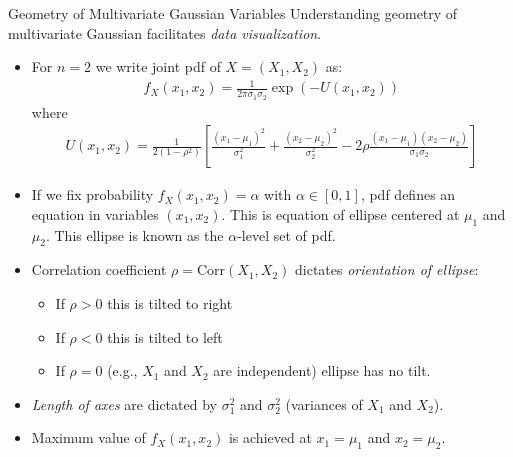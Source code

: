 \documentclass[9pt]{beamer}
\begin{document}
%
\begin{frame}{Geometry of Multivariate Gaussian Variables}
Understanding geometry of multivariate Gaussian facilitates {\em data visualization}.  

\begin{itemize}
\setlength{\itemsep}{5pt}
\item For $n=2$ we write joint pdf of $X=(X_1,X_2)$ as:
\begin{align*}
f_X(x_1,x_2)=\frac{1}{2\pi\sigma_1\sigma_2}\exp\left(-U(x_1,x_2)\right)
\end{align*}
where 
\begin{align*}
U(x_1,x_2)=\frac{1}{2(1-\rho^2)}\left[\frac{(x_1-\mu_1)^2}{\sigma_1^2}+\frac{(x_2-\mu_2)^2}{\sigma_2^2}-2\rho\frac{(x_1-\mu_1)(x_2-\mu_2)}{\sigma_1\sigma_2}\right]
\end{align*}

\item If we fix probability $f_X(x_1,x_2)=\alpha$ with $\alpha\in [0,1]$, pdf defines an equation in variables $(x_1,x_2)$.  This is equation of ellipse centered at $\mu_1$ and $\mu_2$.  This ellipse is known as the $\alpha$-level set of pdf.  

\item Correlation coefficient $\rho=\textrm{Corr}(X_1,X_2)$ dictates {\em orientation of ellipse}: 
\begin{itemize}
\item If $\rho>0$ this is tilted to right
\item If $\rho<0$ this is tilted to  left
\item If $\rho=0$ (e.g., $X_1$ and $X_2$ are independent) ellipse has no tilt. 
\end{itemize}
\item {\em Length of axes} are dictated by $\sigma_1^2$ and $\sigma_2^2$ (variances of $X_1$ and $X_2$).

\item Maximum value of $f_X(x_1,x_2)$ is achieved at $x_1=\mu_1$ and $x_2=\mu_2$. 

\end{itemize}

\end{frame}
\end{document}
